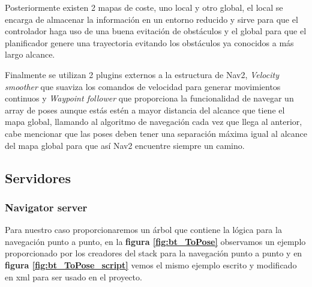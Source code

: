 Posteriormente existen 2 mapas de coste, uno local y otro global, el local se encarga de almacenar la información en un entorno reducido y sirve 
para que el controlador haga uso de una buena evitación de obstáculos  y el global para que el planificador genere una trayectoria evitando los obstáculos ya conocidos a más largo alcance.

Finalmente se utilizan 2 plugins externos a la estructura de Nav2, \textit{Velocity smoother} que suaviza los comandos de velocidad para generar movimientos continuos y 
\textit{Waypoint follower} que proporciona la funcionalidad de navegar un array de poses aunque estás estén a mayor distancia del alcance que tiene 
el mapa global, llamando al algoritmo de navegación cada vez que llega al anterior, cabe mencionar que las poses deben tener una separación máxima igual al 
alcance del mapa global para que así Nav2 encuentre siempre un camino.


\subsection{Servidores}
\subsubsection{Navigator server}
Para nuestro caso proporcionaremos un árbol que contiene la lógica para la navegación punto a punto, en la \textbf{figura \ref{fig:bt_ToPose}} observamos un ejemplo proporcionado por 
los creadores del stack para la navegación punto a punto y en  \textbf{figura \ref{fig:bt_ToPose_script}} vemos el mismo ejemplo escrito y modificado en xml para ser usado en 
el proyecto.

